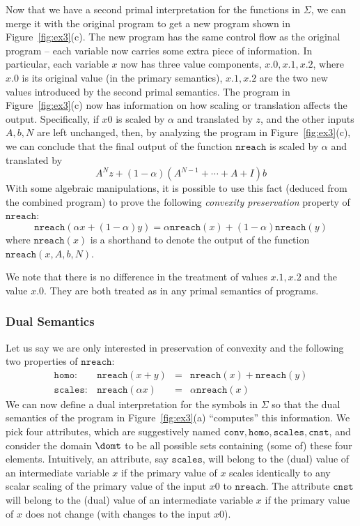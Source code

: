 \documentclass[preprint]{sig-alternate-05-2015}
\def\Sig{{\Sigma}}
\def\nreach{{\mathtt{nreach}}}
\def\conv{{\mathtt{conv}}}
\def\scales{{\mathtt{scales}}}
\def\homo{{\mathtt{homo}}}
\def\cnst{{\mathtt{cnst}}}
\begin{document}
{Now that we have a second primal interpretation for the
functions in $\Sig$, we can merge it with the original
program to get a new program shown in Figure~\ref{fig:ex3}(c).
The new program has the same control flow as the original
program -- each variable now carries some extra piece of
information. In particular, each variable $x$ now has
three value components, $x.0,x.1,x.2$, where $x.0$ is
its original value (in the primary semantics),
$x.1,x.2$ are the two new values introduced by the second
primal semantics.
The program in Figure~\ref{fig:ex3}(c) now has information
on how scaling or translation affects the output.
Specifically, if $x0$ is scaled by $\alpha$ and translated
by $z$, and the other inputs $A,b,N$ are left unchanged,
then, by analyzing the program in Figure~\ref{fig:ex3}(c),
we can conclude that the final output of the function $\nreach$ is scaled
by $\alpha$ and translated by
$$
A^Nz + (1-\alpha)(A^{N-1}+\cdots+A+I)b
$$
With some algebraic manipulations, it is possible to use this
fact (deduced from the combined program)
to prove the following {\em{convexity preservation}} property
of $\nreach$:
$$
\nreach(\alpha x+(1-\alpha)y) =
\alpha\nreach(x) +(1-\alpha)\nreach(y)
$$
where $\nreach(x)$ is a shorthand to denote the output of the function
$\nreach(x,A,b,N)$.

We note that there is no difference in the treatment
of values $x.1,x.2$ and the value $x.0$. They are both
treated as in any primal semantics of programs.

\subsubsection{Dual Semantics}

Let us say we are only interested in preservation of convexity
and the following two properties of $\nreach$:
\[
  \begin{array}{rrcl}
    \homo: &\nreach(x+y) & = & \nreach(x)+\nreach(y)
  \\
  \scales: &\nreach(\alpha x) & = & \alpha\nreach(x)
\end{array}
\]
We can now define a dual interpretation for the symbols
in $\Sig$ so that the dual semantics of the program in
Figure~\ref{fig:ex3}(a) ``computes'' this information.
We pick four attributes, which are suggestively named
$\conv,\homo,\scales,\cnst$, and consider
the domain $\domt$ to be all possible sets containing
(some of) these four elements.
Intuitively, an attribute, say $\scales$,
will belong to the (dual) value of an intermediate variable
$x$ if the primary value of $x$ scales identically to any scalar
scaling of the
primary value of the input $x0$ to $\nreach$.
The attribute $\cnst$
will belong to the (dual) value of an intermediate variable
$x$ if the primary value of $x$ does not change (with changes
to the input $x0$).

}
\end{document}
